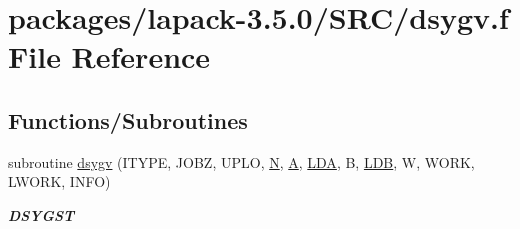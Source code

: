 \hypertarget{dsygv_8f}{}\section{packages/lapack-\/3.5.0/\+S\+R\+C/dsygv.f File Reference}
\label{dsygv_8f}
\subsection*{Functions/\+Subroutines}
\begin{DoxyCompactItemize}
\item 
subroutine \hyperlink{group__doubleSYeigen_ga007d33bcdcc697e17c6d15432f159b73}{dsygv} (I\+T\+Y\+P\+E, J\+O\+B\+Z, U\+P\+L\+O, \hyperlink{polmisc_8c_a0240ac851181b84ac374872dc5434ee4}{N}, \hyperlink{classA}{A}, \hyperlink{example__user_8c_ae946da542ce0db94dced19b2ecefd1aa}{L\+D\+A}, B, \hyperlink{example__user_8c_a50e90a7104df172b5a89a06c47fcca04}{L\+D\+B}, W, W\+O\+R\+K, L\+W\+O\+R\+K, I\+N\+F\+O)
\begin{DoxyCompactList}\small\item\em {\bfseries D\+S\+Y\+G\+S\+T} \end{DoxyCompactList}\end{DoxyCompactItemize}
